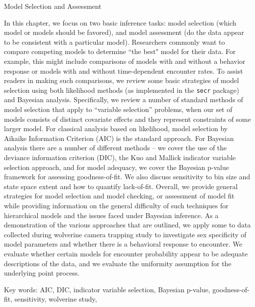Model Selection and Assessment


In this chapter,
we focus on two basic inference tasks: model
selection (which model or models should be favored), and model
assessment (do the data appear to be consistent with a particular
model).  Researchers commonly want to compare competing models to determine
``the best" model for their data.  For example, this might include comparisons of models with
and without a behavior response or models with and without time-dependent encounter rates.
To assist readers in making such comparisons, we review some basic strategies of model selection using
both likelihood methods (as implemented in the \mbox{\tt secr}
package) and Bayesian analysis.  Specifically, we review a number of
standard methods of model selection that apply to ``variable
selection'' problems, when our set of models consists of distinct
covariate effects and they represent constraints of some larger model.
For classical analysis based on likelihood, model selection by Aikaike
Information Criterion (AIC) is the standard approach.  
For Bayesian analysis there are a
number of different methods -- we cover the use of the deviance
information criterion (DIC), the
Kuo and Mallick indicator variable selection approach, and for model 
adequacy, we cover the Bayesian p-value framework for assessing goodness-of-fit.  We also 
discuss sensitivity to bin size and state space extent and how to quantify lack-of-fit.  
Overall, we provide general strategies for model
selection and model checking, or assessment of model fit while providing information
on the general difficulty of such techniques for hierarchical models and the issues faced under
Bayesian inference.
As a demonstration of the various approaches that are outlined, we apply some to data collected during  
wolverine camera trapping
study to investigate sex
specificity of model parameters and whether there is a behavioral
response to encounter.  We evaluate whether
certain models for encounter probability appear to be adequate
descriptions of the data, and we evaluate the uniformity assumption
for the underlying point process.   

Key words:  AIC, DIC, indicator variable selection, Bayesian p-value, goodness-of-fit, 
sensitivity, wolverine study, 




